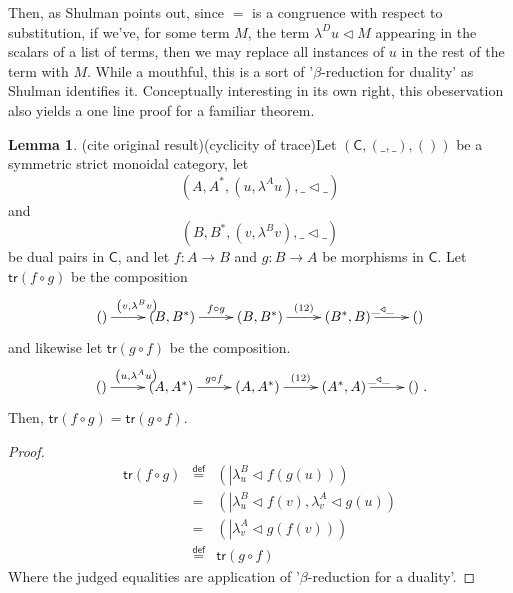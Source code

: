 \documentclass[pra,floatfix,
amsmath,superscriptaddress, 12pt]{article}
\theoremstyle{definition}
\newtheorem{lem}[thm]{Lemma}
\begin{document}
Then, as Shulman points out, since $=$ is a congruence with respect
to substitution, if we've, for some term $M$, the term $\lambda^{D}u\triangleleft M$
appearing in the scalars of a list of terms, then we may replace all
instances of $u$ in the rest of the term with $M$. While a mouthful,
this is a sort of '$\beta$-reduction for duality' as Shulman identifies it. Conceptually interesting in its own right, this obeservation also yields a one line
proof for a familiar theorem.
\begin{lem}
(cite original result)(cyclicity of trace)Let $\left(\mathsf{C},\left(\_,\_\right),\left(\right)\right)$
be a symmetric strict monoidal category, let 
\[
\left(A,A^{*},\left(u,\lambda^{A}u\right),\_\triangleleft\_\right)
\]
 and 
\[
\left(B,B^{*},\left(v,\lambda^{B}v\right),\_\triangleleft\_\right)
\]
 be dual pairs in $\mathsf{C}$, and let $f:A\longrightarrow B$ and $g:B\longrightarrow A$
be morphisms in $\mathsf{C}$. Let $\mathsf{tr}\left(f\circ g\right)$ be
the composition 
\[
\xymatrixrowsep{0pc}\xymatrix{\left(\right)\ar[r]^{\left(v,\lambda^{B}v\right)} & \left(B,B^{*}\right)\ar[r]^{f\circ g} & \left(B,B^{*}\right)\ar[r]^{\left(12\right)} & \left(B^{*},B\right)\ar[r]^{\_\triangleleft\_} & \left(\right)}
\]
and likewise let $\mathsf{tr}\left(g\circ f\right)$ be the composition.
\[
\xymatrixrowsep{0pc}\xymatrix{\left(\right)\ar[r]^{\left(u,\lambda^{A}u\right)} & \left(A,A^{*}\right)\ar[r]^{g\circ f} & \left(A,A^{*}\right)\ar[r]^{\left(12\right)} & \left(A^{*},A\right)\ar[r]^{\_\triangleleft\_} & \left(\right)}
.
\]
Then, $\mathsf{tr}\left(f\circ g\right)=\mathsf{tr}\left(g\circ f\right)$.
\end{lem}

\begin{proof}
\begin{eqnarray*}
\mathsf{tr}\left(f\circ g\right) & \overset{\mathsf{def}}{=} & \left(\left|\lambda_{u}^{B}\triangleleft f\left(g\left(u\right)\right)\right.\right)\\
 & = & \left(\left|\lambda_{u}^{B}\triangleleft f\left(v\right)\right.,\lambda_{v}^{A}\triangleleft g\left(u\right)\right)\\
 & = & \left(\left|\lambda_{v}^{A}\triangleleft g\left(f\left(v\right)\right)\right.\right)\\
 & \overset{\mathsf{def}}{=} & \mathsf{tr}\left(g\circ f\right)
\end{eqnarray*}
Where the judged equalities are application of '$\beta$-reduction
for a duality'.
\end{proof}
\end{document}
